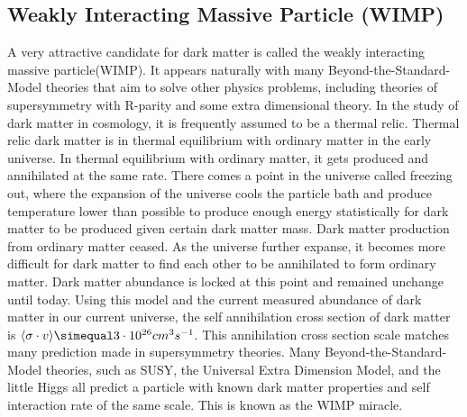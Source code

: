 \subsection{Weakly Interacting Massive Particle (WIMP)}
A very attractive candidate for dark matter is called the weakly interacting massive particle(WIMP). It appears naturally with many Beyond-the-Standard-Model theories that aim to solve other physics problems, including theories of supersymmetry with R-parity and some extra dimensional theory. 
In the study of dark matter in cosmology, it is frequently assumed to be a thermal relic. Thermal relic dark matter is in thermal equilibrium with ordinary matter in the early universe. In thermal equilibrium with ordinary matter, it gets produced and annihilated at the same rate. There comes a point in the universe called freezing out, where the expansion of the universe cools the particle bath and produce temperature lower than possible to produce enough energy statistically for dark matter to
be produced given certain dark matter mass. Dark matter production from ordinary matter ceased. As the universe further expanse, it becomes more difficult for dark matter to find each other to be annihilated to form ordinary matter. Dark matter abundance is locked at this point and remained unchange until today. 
Using this model and the current measured abundance of dark matter in our current universe, the self annihilation cross section of dark matter is $ \langle \sigma \cdot v \rangle \simequal 3 \cdot 10^{26}cm^{3} s^{-1}$. This annihilation cross section scale matches many prediction made in supersymmetry theories. Many Beyond-the-Standard-Model theories, such as SUSY, the Universal Extra Dimension Model, and the little Higgs all predict a particle with known dark matter properties and self interaction rate of the same scale. This is known as the WIMP miracle. ~\cite{Dev_2014}




